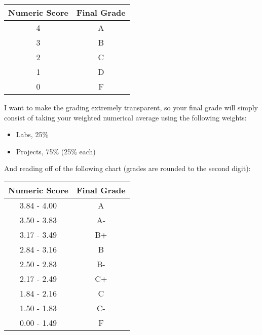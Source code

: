 \documentclass[12pt]{article}
\begin{document}
\begin{center}
\begin{tabular}{c || c}
Numeric Score & Final Grade \\
\hline \hline
4 & A  \\
3 & B  \\
2 & C  \\
1 & D  \\
0 & F
\end{tabular}
\end{center}

I want to make the grading extremely transparent, so your final grade will
simply consist of taking your weighted numerical average using the following
weights:

\begin{itemize}\setlength\itemsep{0em}
\item Labs, 25\%
\item Projects, 75\% (25\% each)
\end{itemize}

And reading off of the following chart (grades are rounded to the
second digit):

\begin{center}
\begin{tabular}{c || c}
Numeric Score & Final Grade \\
\hline \hline
3.84 - 4.00 & A  \\
3.50 - 3.83 & A- \\
3.17 - 3.49 & B+ \\
2.84 - 3.16 & B  \\
2.50 - 2.83 & B- \\
2.17 - 2.49 & C+ \\
1.84 - 2.16 & C  \\
1.50 - 1.83 & C- \\
0.00 - 1.49 & F
\end{tabular}
\end{center}





\end{document}
